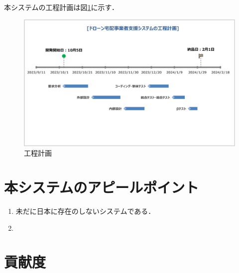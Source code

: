 \documentclass[a4paper, titlepage]{jsarticle}
\begin{document}
本システムの工程計画は図\ref{schedule}に示す．
\begin{figure}[htbp]
        \label{schedule}
        \centering
        \includegraphics[width=15cm]{schedule.png}
        \caption{工程計画}
\end{figure}

\section{本システムのアピールポイント}
\begin{enumerate}
        \item 未だに日本に存在のしないシステムである．
        \item
\end{enumerate}

\section{貢献度}
\end{document}
